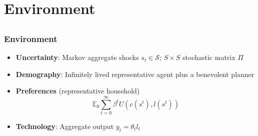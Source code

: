 \documentclass{beamer}
\begin{document}
%
%
%
%
%


\section{Environment}
\subsection{}

\begin{frame}
 \frametitle{Environment}
 \begin{itemize}
 \item \textbf{Uncertainty}: Markov aggregate shocks $s_t\in \mathcal{S}$; $S \times S$ stochastic matrix $\Pi$
  \item \textbf{Demography}: Infinitely lived representative agent plus a benevolent planner
  \item \textbf{Preferences }(representative household)
  \begin{equation*}
\mathbb{E}_{0}\sum_{t=0}^{\infty } \beta^t  U\left(
c(s^t),l(s^t)\right)  \label{utility lifetime}
\end{equation*}%
  \item \textbf{Technology}: Aggregate output  $y_t=\theta_{t} l_{t}$
   \end{itemize}

\end{frame}
\end{document}
